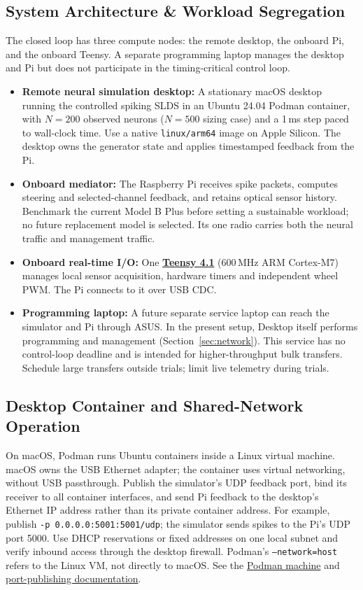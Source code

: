 \subsection{System Architecture \& Workload Segregation}
The closed loop has three compute nodes: the remote desktop, the onboard Pi, and the onboard Teensy. A separate programming laptop manages the desktop and Pi but does not participate in the timing-critical control loop.
\begin{itemize}
    \item \textbf{Remote neural simulation desktop:} A stationary macOS desktop running the controlled spiking SLDS in an Ubuntu 24.04 Podman container, with $N=200$ observed neurons ($N=500$ sizing case) and a 1\,ms step paced to wall-clock time. Use a native \texttt{linux/arm64} image on Apple Silicon. The desktop owns the generator state and applies timestamped feedback from the Pi.
    \item \textbf{Onboard mediator:} The Raspberry Pi receives spike packets, computes steering and selected-channel feedback, and retains optical sensor history. Benchmark the current Model B Plus before setting a sustainable workload; no future replacement model is selected. Its one radio carries both the neural traffic and management traffic.
    \item \textbf{Onboard real-time I/O:} One \href{https://www.pjrc.com/store/teensy41.html}{\textbf{Teensy 4.1}} (600\,MHz ARM Cortex-M7) manages local sensor acquisition, hardware timers and independent wheel PWM. The Pi connects to it over USB CDC.
    \item \textbf{Programming laptop:} A future separate service laptop can reach the simulator and Pi through ASUS. In the present setup, Desktop itself performs programming and management (Section~\ref{sec:network}). This service has no control-loop deadline and is intended for higher-throughput bulk transfers. Schedule large transfers outside trials; limit live telemetry during trials.
\end{itemize}

\subsection{Desktop Container and Shared-Network Operation}
On macOS, Podman runs Ubuntu containers inside a Linux virtual machine. macOS owns the USB Ethernet adapter; the container uses virtual networking, without USB passthrough. Publish the simulator's UDP feedback port, bind its receiver to all container interfaces, and send Pi feedback to the desktop's Ethernet IP address rather than its private container address. For example, publish \texttt{-p 0.0.0.0:5001:5001/udp}; the simulator sends spikes to the Pi's UDP port 5000. Use DHCP reservations or fixed addresses on one local subnet and verify inbound access through the desktop firewall. Podman's \texttt{--network=host} refers to the Linux VM, not directly to macOS. See the \href{https://docs.podman.io/en/latest/markdown/podman-machine-init.1.html}{Podman machine} and \href{https://docs.podman.io/en/latest/markdown/podman-run.1.html}{port-publishing documentation}.

